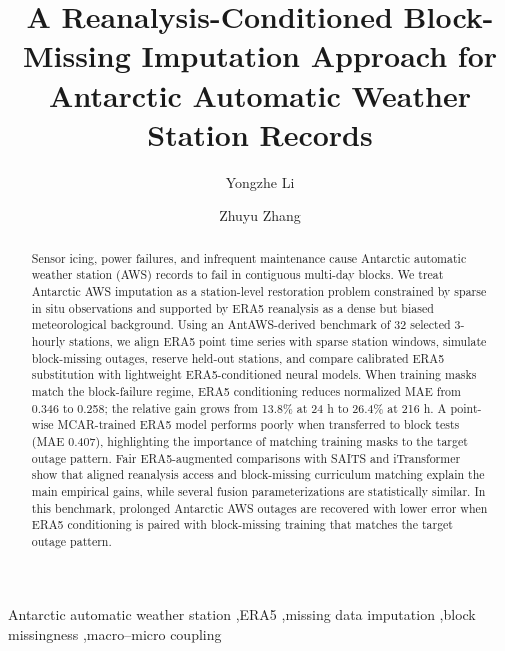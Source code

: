 \documentclass[preprint,12pt,authoryear]{elsarticle}
\begin{document}
\begin{frontmatter}

\title{A Reanalysis-Conditioned Block-Missing Imputation Approach for Antarctic Automatic Weather Station Records}

\author[seu]{Yongzhe Li}
\author[seu]{Zhuyu Zhang}
\address[seu]{School of Mechanical Engineering, Southeast University, Nanjing, China}

\begin{abstract}
Sensor icing, power failures, and infrequent maintenance cause Antarctic automatic weather station (AWS) records to fail in contiguous multi-day blocks. We treat Antarctic AWS imputation as a station-level restoration problem constrained by sparse in situ observations and supported by ERA5 reanalysis as a dense but biased meteorological background. Using an AntAWS-derived benchmark of 32 selected 3-hourly stations, we align ERA5 point time series with sparse station windows, simulate block-missing outages, reserve held-out stations, and compare calibrated ERA5 substitution with lightweight ERA5-conditioned neural models. When training masks match the block-failure regime, ERA5 conditioning reduces normalized MAE from 0.346 to 0.258; the relative gain grows from 13.8\% at 24 h to 26.4\% at 216 h. A point-wise MCAR-trained ERA5 model performs poorly when transferred to block tests (MAE 0.407), highlighting the importance of matching training masks to the target outage pattern. Fair ERA5-augmented comparisons with SAITS and iTransformer show that aligned reanalysis access and block-missing curriculum matching explain the main empirical gains, while several fusion parameterizations are statistically similar. In this benchmark, prolonged Antarctic AWS outages are recovered with lower error when ERA5 conditioning is paired with block-missing training that matches the target outage pattern.
\end{abstract}

\begin{keyword}
Antarctic automatic weather station \sep ERA5 \sep missing data imputation \sep block missingness \sep macro--micro coupling
\end{keyword}

\end{frontmatter}

\linenumbers









\end{document}
